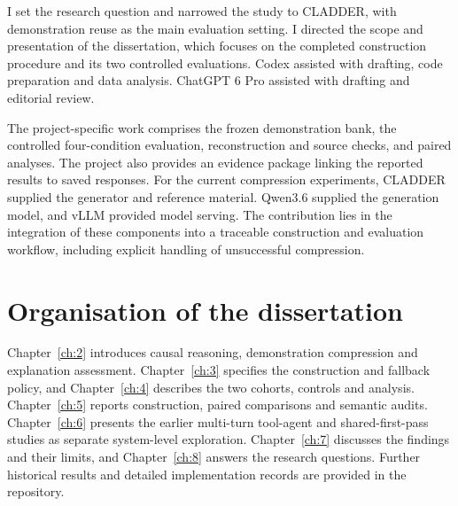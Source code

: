 I set the research question and narrowed the study to CLADDER, with demonstration reuse as the main evaluation setting. I directed the scope and presentation of the dissertation, which focuses on the completed construction procedure and its two controlled evaluations. Codex assisted with drafting, code preparation and data analysis. ChatGPT 6 Pro assisted with drafting and editorial review.

The project-specific work comprises the frozen demonstration bank, the controlled four-condition evaluation, reconstruction and source checks, and paired analyses. The project also provides an evidence package linking the reported results to saved responses. For the current compression experiments, CLADDER supplied the generator and reference material. Qwen3.6 supplied the generation model, and vLLM provided model serving. The contribution lies in the integration of these components into a traceable construction and evaluation workflow, including explicit handling of unsuccessful compression.

\section{Organisation of the dissertation}\label{sec:1.4}

Chapter~\ref{ch:2} introduces causal reasoning, demonstration compression and explanation assessment. Chapter~\ref{ch:3} specifies the construction and fallback policy, and Chapter~\ref{ch:4} describes the two cohorts, controls and analysis. Chapter~\ref{ch:5} reports construction, paired comparisons and semantic audits. Chapter~\ref{ch:6} presents the earlier multi-turn tool-agent and shared-first-pass studies as separate system-level exploration. Chapter~\ref{ch:7} discusses the findings and their limits, and Chapter~\ref{ch:8} answers the research questions. Further historical results and detailed implementation records are provided in the repository.
